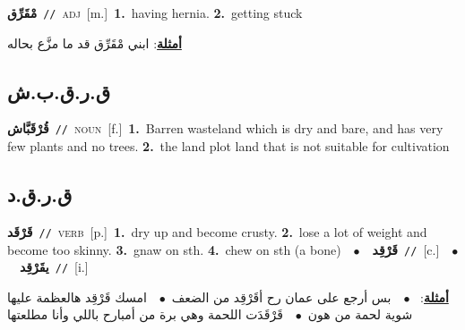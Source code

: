 \documentclass[10pt,a4paper,twoside]{article} %
\begin{document}
\begin{multicols}{2}
{\setlength\topsep{0pt}\textbf{\foreignlanguage{arabic}{مْقَرِّق}}\ {\color{gray}\texttt{//}\color{black}}\ \textsc{adj}\ [m.]\ \textbf{1.}~having hernia.  \textbf{2.}~getting stuck\  \begin{flushright}\color{gray}\foreignlanguage{arabic}{\textbf{\underline{\foreignlanguage{arabic}{أمثلة}}}: ابني مْقَرِّق قد ما مزَّع بحاله}\end{flushright}\color{black}} \vspace{2mm}

\vspace{-3mm}
\subsection*{\color{blue}\foreignlanguage{arabic}{ق.ر.ق.ب.ش}\color{blue}{ (ntws)}} 

{\setlength\topsep{0pt}\textbf{\foreignlanguage{arabic}{قُرْقَبَّاش}}\ {\color{gray}\texttt{//}\color{black}}\ \textsc{noun}\ [f.]\ \textbf{1.}~Barren wasteland which is dry and bare, and has very few plants and no trees.  \textbf{2.}~the land plot land that is not suitable for cultivation\ } \vspace{2mm}

\vspace{-3mm}
\subsection*{\color{blue}\foreignlanguage{arabic}{ق.ر.ق.د}\color{blue}{}} 

{\setlength\topsep{0pt}\textbf{\foreignlanguage{arabic}{قَرْقَد}}\ {\color{gray}\texttt{//}\color{black}}\ \textsc{verb}\ [p.]\ \textbf{1.}~dry up and become crusty.  \textbf{2.}~lose a lot of weight and become too skinny.  \textbf{3.}~gnaw on sth.  \textbf{4.}~chew on sth (a bone)\ \ $\bullet$\ \ \setlength\topsep{0pt}\textbf{\foreignlanguage{arabic}{قَرْقِد}}\ {\color{gray}\texttt{//}\color{black}}\ [c.]\ \ $\bullet$\ \ \setlength\topsep{0pt}\textbf{\foreignlanguage{arabic}{يقَرْقِد}}\ {\color{gray}\texttt{//}\color{black}}\ [i.]\  \begin{flushright}\color{gray}\foreignlanguage{arabic}{\textbf{\underline{\foreignlanguage{arabic}{أمثلة}}}: \ $\bullet$\ \  بس أرجع على عمان رح أقَرْقِد من الضعف\ $\bullet$\ \  امسك قَرْقِد هالعظمة عليها شوية لحمة من هون\ $\bullet$\ \  قَرْقَدَت اللحمة وهي برة من أمبارح باللي وأنا مطلعتها}\end{flushright}\color{black}} \vspace{2mm}


\end{multicols}
\end{document}
